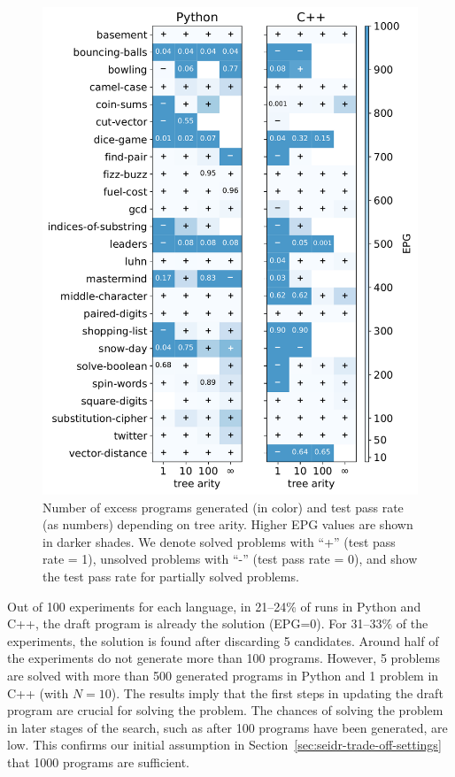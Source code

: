 \begin{figure}
  \centering
  \includegraphics[width=.56\textwidth, trim={3mm 1.6mm 3mm 2mm}, clip]{images/num_programs_generated_vs_bf_test_pass_rate_vertical_maxprog_1000_v3.pdf}
  \caption{Number of excess programs generated (in color) and test pass rate (as numbers) depending on tree arity. Higher EPG values are shown in darker shades. We denote solved problems with ``+'' (test pass rate = 1), unsolved problems with ``-'' (test pass rate = 0), and show the test pass rate for partially solved problems. }
  \label{fig:seidr:epg-bf}
\end{figure}

Out of 100 experiments for each language, in 21--24\% of runs in Python and C++, the draft program is already the solution (EPG=0). 
For 31--33\% of the experiments, the solution is found after discarding 5 candidates. 
Around half of the experiments do not generate more than 100 programs. 
However, 5 problems are solved with more than 500 generated programs in Python and 1 problem in C++ (with $N=10$).
The results imply that the first steps in updating the draft program are crucial for solving the problem. 
The chances of solving the problem in later stages of the search, such as after 100 programs have been generated, are low.
This confirms our initial assumption in Section~\ref{sec:seidr-trade-off-settings} that 1000 programs are sufficient.


